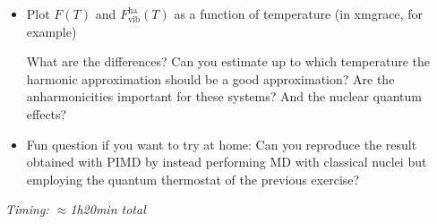 \documentclass[a4paper,11pt]{scrartcl}
\begin{document}
\begin{itemize}
\item{ Plot $F(T)$  and $F^{\text{ha}}_{\text{vib}}(T)$ as a function of temperature (in xmgrace, for example) }



\vspace{0.3cm}
What are the differences? Can you estimate up to which temperature the harmonic approximation should be a good approximation? Are the anharmonicities important for these systems? And the nuclear quantum effects?




\item Fun question if you want to try at home: Can you reproduce the result obtained with PIMD by instead performing MD with classical nuclei but employing the quantum thermostat of the previous exercise?

\end{itemize}






\textit{Timing: $\approx$1h20min total}

\clearpage
\end{document}
